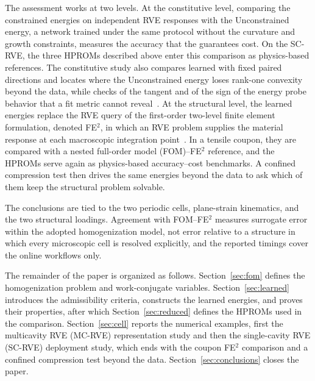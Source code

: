 The assessment works at two levels. At the constitutive level, comparing the constrained energies on independent RVE responses with the Unconstrained energy, a network trained under the same protocol without the curvature and growth constraints, measures the accuracy that the guarantees cost. On the SC-RVE, the three HPROMs described above enter this comparison as physics-based references. The constitutive study also compares learned with fixed paired directions and locates where the Unconstrained energy loses rank-one convexity beyond the data, while checks of the tangent and of the sign of the energy probe behavior that a fit metric cannot reveal~\cite{Tac2024}. At the structural level, the learned energies replace the RVE query of the first-order two-level finite element formulation, denoted FE$^2$, in which an RVE problem supplies the material response at each macroscopic integration point~\cite{feyel2003multilevel}. In a tensile coupon, they are compared with a nested full-order model (FOM)--FE$^2$ reference, and the HPROMs serve again as physics-based accuracy--cost benchmarks. A confined compression test then drives the same energies beyond the data to ask which of them keep the structural problem solvable.

The conclusions are tied to the two periodic cells, plane-strain kinematics, and the two structural loadings. Agreement with FOM--FE$^2$ measures surrogate error within the adopted homogenization model, not error relative to a structure in which every microscopic cell is resolved explicitly, and the reported timings cover the online workflows only.

The remainder of the paper is organized as follows. Section~\ref{sec:fom} defines the homogenization problem and work-conjugate variables. Section~\ref{sec:learned} introduces the admissibility criteria, constructs the learned energies, and proves their properties, after which Section~\ref{sec:reduced} defines the HPROMs used in the comparison. Section~\ref{sec:cell} reports the numerical examples, first the multicavity RVE (MC-RVE) representation study and then the single-cavity RVE (SC-RVE) deployment study, which ends with the coupon FE$^2$ comparison and a confined compression test beyond the data. Section~\ref{sec:conclusions} closes the paper.

\FloatBarrier
